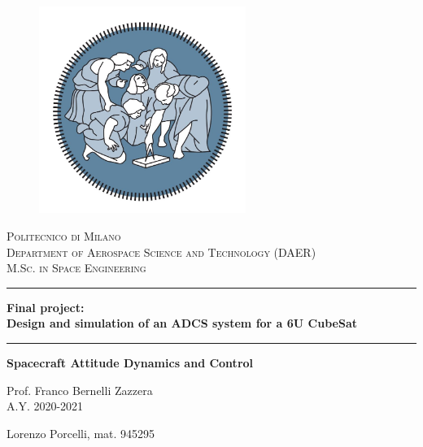 \begin{titlingpage}
\begin{center}
    \begin{figure}
        \centering
        \includegraphics[width=0.6\textwidth]{graphics/logopolimi_mod.jpg}
    \end{figure}
\Large{\textsc{Politecnico di Milano \\ Department of Aerospace Science and Technology (DAER) \\ M.Sc. in Space Engineering}}

\vspace{1cm}

\rule{0.95\textwidth}{0.7mm}
{\Large{\textbf{Final project: \\Design and simulation of an ADCS system for a 6U CubeSat}}}
\rule{0.95\textwidth}{0.7mm}

\vspace{1cm}

\large{\textbf{Spacecraft Attitude Dynamics and Control}}

\large{Prof. Franco Bernelli Zazzera \\ A.Y. 2020-2021}

\vspace{1cm}

Lorenzo Porcelli, mat. 945295

\end{center}

\end{titlingpage}